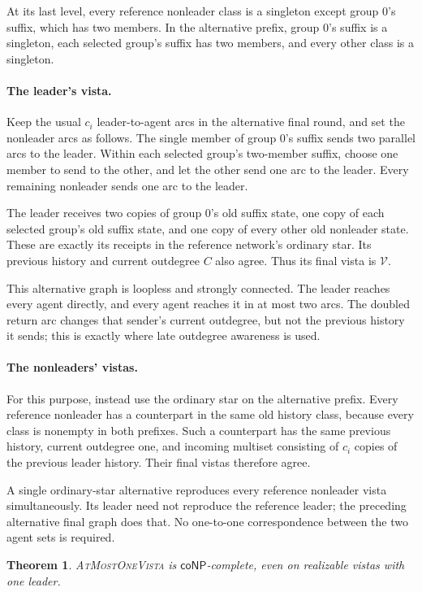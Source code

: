 \documentclass[11pt]{article}
\newtheorem{theorem}{Theorem}
\begin{document}
At its last level, every reference nonleader class is a singleton
except group \(0\)'s suffix, which has two members.
In the alternative prefix, group \(0\)'s suffix is a singleton,
each selected group's suffix has two members, and every other
class is a singleton.

\paragraph{The leader's vista.}
Keep the usual \(c_i\) leader-to-agent arcs in the alternative
final round, and set the nonleader arcs as follows.
The single member of group \(0\)'s suffix sends two parallel arcs
to the leader. Within each selected group's two-member suffix,
choose one member to send to the other, and let the other send
one arc to the leader. Every remaining nonleader sends one arc
to the leader.

The leader receives two copies of group \(0\)'s old suffix state,
one copy of each selected group's old suffix state, and one copy
of every other old nonleader state. These are exactly its receipts
in the reference network's ordinary star. Its previous history and current
outdegree \(C\) also agree. Thus its final vista is \(\mathcal V\).

This alternative graph is loopless and strongly connected.
The leader reaches every agent directly, and every agent reaches
it in at most two arcs. The doubled return arc changes that
sender's current outdegree, but not the previous history it sends;
this is exactly where late outdegree awareness is used.

\paragraph{The nonleaders' vistas.}
For this purpose, instead use the ordinary star on the alternative
prefix. Every reference nonleader has a counterpart in the same
old history class, because every class is nonempty in both
prefixes. Such a counterpart has the same previous history,
current outdegree one, and incoming multiset consisting of
\(c_i\) copies of the previous leader history.
Their final vistas therefore agree.

A single ordinary-star alternative reproduces every reference
nonleader vista simultaneously. Its leader need not reproduce the
reference leader; the preceding alternative final graph does that.
No one-to-one correspondence between the two agent sets is required.

\begin{theorem}
\label{thm:conp-vista-complete}
\textnormal{\textsc{AtMostOneVista}} is \(\mathsf{coNP}\)-complete, even on realizable vistas with one leader.
\end{theorem}
\end{document}
